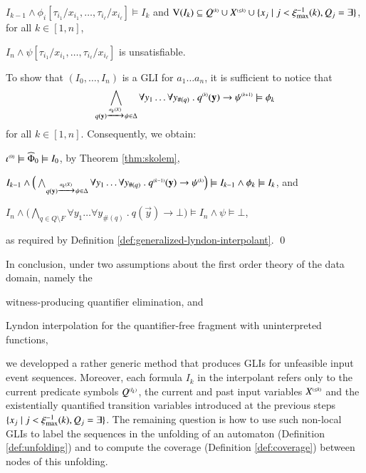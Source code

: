 {\begin{compactitem}
    \item $I_{k-1} \wedge \phi_i[\tau_{i_1}/x_{i_1}, \ldots,
      \tau_{i_\ell}/x_{i_\ell}] \models I_k$ and $\mathrm{V}({I_k}) \subseteq
      {Q}^{\scriptscriptstyle{({k})}} \cup {X}^{\scriptscriptstyle{({\leq k})}} \cup \{ x_j \mid j <
       \xi_{\max}^{-1}(k), Q_j = \exists \}$, for all $k \in [1,n]$,
    \item $I_n \wedge \psi[\tau_{i_1}/x_{i_1}, \ldots,
      \tau_{i_\ell}/x_{i_\ell}]$ is unsatisfiable.
  \end{compactitem}
  To show that $(I_0,\ldots,I_n)$ is a GLI for $a_1\ldots a_n$, it is
  sufficient to notice that \[\bigwedge_{q(\mathbf y) \xrightarrow{{\scriptscriptstyle a_k(X)}}_{{\scriptstyle }}
    \psi \in \Delta} \forall y_1 \ldots \forall y_{\#(q)} ~.~
  {q}^{\scriptscriptstyle{({k})}}(\mathbf y) \rightarrow {\psi}^{\scriptscriptstyle{({k+1})}} \models \phi_k\]
  for all $k \in [1,n]$. Consequently, we obtain: \begin{compactitem}
    \item ${\iota}^{\scriptscriptstyle{({0})}} \models \widehat{\Phi}_0 \models I_0$, by
      Theorem \ref{thm:skolem},
    \item $I_{k-1} \wedge \Big(\bigwedge_{q(\mathbf y) \xrightarrow{{\scriptscriptstyle a_k(X)}}_{{\scriptstyle }}
      \psi \in \Delta} \forall y_1 \ldots \forall y_{\#(q)} ~.~
      {q}^{\scriptscriptstyle{({k-1})}}(\mathbf y) \rightarrow {\psi}^{\scriptscriptstyle{({k})}}\Big) \models
      I_{k-1} \wedge \phi_k \models I_k$, and 
    \item $I_n \wedge \Big(\bigwedge_{q \in Q \setminus F} \forall y_1
      \ldots \forall y_{\#(q)} ~.~ q(\vec{y}) \rightarrow \bot\Big)
      \models I_n \wedge \psi \models \bot$,     
  \end{compactitem}
  as required by Definition
  \ref{def:generalized-lyndon-interpolant}. \qed}

In conclusion, under two assumptions about the first order theory of
the data domain, namely the\ \begin{inparaenum}[(i)]
\item witness-producing quantifier elimination, and
\item Lyndon interpolation for the quantifier-free fragment with
  uninterpreted functions,
\end{inparaenum}
we developped a rather generic method that produces GLIs for
unfeasible input event sequences. Moreover, each formula $I_k$ in the
interpolant refers only to the current predicate symbols
${Q}^{\scriptscriptstyle{({I_k})}}$, the current and past input variables ${X}^{\scriptscriptstyle{({\leq
  k})}}$ and the existentially quantified transition variables introduced
at the previous steps $\{ x_j \mid j < \xi_{\max}^{-1}(k), Q_j =
  \exists \}$. The remaining question is how to use such non-local GLIs
to label the sequences in the unfolding of an automaton (Definition
\ref{def:unfolding}) and to compute the coverage (Definition
\ref{def:coverage}) between nodes of this unfolding.

